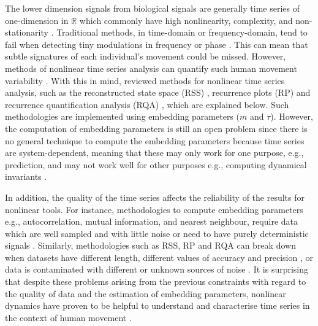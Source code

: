 The lower dimension signals from biological signals are generally time series 
of one-dimension in $\mathbb{R}$ which commonly have 
high nonlinearity, complexity, and non-stationarity \citep{gomezgarcia2014, huffaker2017, caballero2014}.
Traditional methods, in time-domain or frequency-domain, 
tend to fail when detecting tiny modulations in frequency or phase \citep{marwan2011}.
This can mean that subtle signatures of each individual's movement could be missed.
However, methods of nonlinear time series analysis can quantify such 
human movement variability \citep{Quintana-Duque2012, Quintana-Duque2016, sama2013, 
frank2010, gomezgarcia2014, marwan2011, stergiou2011, packard1980}.
With this in mind, \cite{bradley2015} reviewed methods for
nonlinear time series analysis, such as the reconstructed state space (RSS) \citep{takens1981},
recurrence plots (RP) \citep{eckmann1987} and
recurrence quantification analysis (RQA) \citep{zbilut1992}, which are 
explained below.
Such methodologies are implemented using embedding parameters ($m$ and $\tau$).
However, the computation of embedding parameters is still an open problem
since there is no general technique to compute the embedding parameters 
because time series are system-dependent, meaning that these may only work 
for one purpose, e.g., prediction, and may not work well for other purposes
e.g., computing dynamical invariants \citep{bradley2015}.

In addition, the quality of the time series affects the reliability of the results
for nonlinear tools. For instance, methodologies to compute embedding parameters 
e.g., autocorrelation, mutual information, and nearest neighbour,
require data which are well sampled and with little noise \citep{garland2016} 
or need to have purely deterministic signals \citep{kantz2003}.
Similarly, methodologies such as RSS, RP and RQA can break down when 
datasets have different length, different values of accuracy and precision \citep{frank2010},
or data is contaminated with different or unknown sources of noise \citep{garland2016}.
It is surprising that despite these problems arising from the previous constraints 
with regard to the quality of data and the estimation of embedding parameters,
nonlinear dynamics have proven to be helpful to understand and characterise time series
in the context of human movement 
\citep{Quintana-Duque2012, Quintana-Duque2016, sama2013, frank2010,
gomezgarcia2014, marwan2011, stergiou2011, bradley2015}.

